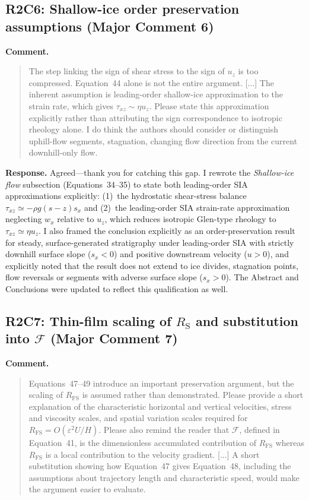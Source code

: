 \documentclass[11pt]{article}
\newcommand{\response}[1]{\noindent\textcolor{responseblue}{#1}}
\begin{document}
\subsection*{R2C6: Shallow-ice order preservation assumptions (Major Comment 6)}

\noindent\textbf{Comment.}
\begin{quote}
The step linking the sign of shear stress to the sign of \(u_z\) is too compressed. Equation~44 alone is not the entire argument. [...] The inherent assumption is leading-order shallow-ice approximation to the strain rate, which gives \(\tau_{xz}\sim\eta u_z\). Please state this approximation explicitly rather than attributing the sign correspondence to isotropic rheology alone. I do think the authors should consider or distinguish uphill-flow segments, stagnation, changing flow direction from the current downhill-only flow.
\end{quote}

\response{\textbf{Response.} Agreed---thank you for catching this gap. I rewrote the \emph{Shallow-ice flow} subsection (Equations~34--35) to state both leading-order SIA approximations explicitly: (1)~the hydrostatic shear-stress balance \(\tau_{xz}\simeq-\rho g(s-z)s_x\) and (2)~the leading-order SIA strain-rate approximation neglecting \(w_x\) relative to \(u_z\), which reduces isotropic Glen-type rheology to \(\tau_{xz}\simeq\eta u_z\). I also framed the conclusion explicitly as an order-preservation result for steady, surface-generated stratigraphy under leading-order SIA with strictly downhill surface slope (\(s_x<0\)) and positive downstream velocity (\(u>0\)), and explicitly noted that the result does not extend to ice divides, stagnation points, flow reversals or segments with adverse surface slope (\(s_x>0\)). The Abstract and Conclusions were updated to reflect this qualification as well.}

\subsection*{R2C7: Thin-film scaling of \(R_{\mathrm{S}}\) and substitution into \(\mathcal{F}\) (Major Comment 7)}

\noindent\textbf{Comment.}
\begin{quote}
Equations~47--49 introduce an important preservation argument, but the scaling of \(R_{\mathrm{FS}}\) is assumed rather than demonstrated. Please provide a short explanation of the characteristic horizontal and vertical velocities, stress and viscosity scales, and spatial variation scales required for \(R_{\mathrm{FS}}=O(\varepsilon^2 U/H)\). Please also remind the reader that \(\mathcal{F}\), defined in Equation~41, is the dimensionless accumulated contribution of \(R_{\mathrm{FS}}\) whereas \(R_{\mathrm{FS}}\) is a local contribution to the velocity gradient. [...] A short substitution showing how Equation~47 gives Equation~48, including the assumptions about trajectory length and characteristic speed, would make the argument easier to evaluate.
\end{quote}
\end{document}
